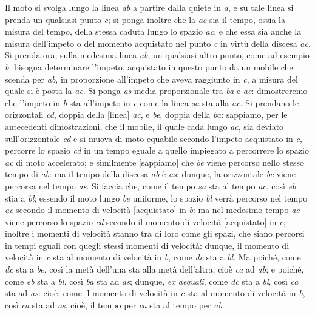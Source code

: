 \documentclass[11pt,twoside,openany]{book}
\begin{document}
Il moto si svolga lungo la linea \emph{ab} a partire dalla quiete in \emph{a}, e su tale linea si prenda un qualsiasi punto \emph{c}; si ponga inoltre che la \emph{ac} sia il tempo, ossia la misura del tempo, della stessa caduta lungo lo spazio \emph{ac}, e che essa sia anche la misura dell'impeto o del momento acquistato nel punto \emph{c} in virtù della discesa \emph{ac}. Si prenda ora, sulla medesima linea \emph{ab}, un qualsiasi altro punto, come ad esempio \emph{b}: bisogna determinare l'impeto, acquistato in questo punto da un mobile che scenda per \emph{ab}, in proporzione all'impeto che aveva raggiunto in \emph{c}, a misura del quale si è posta la \emph{ac}. Si ponga \emph{as} media proporzionale tra \emph{ba} e \emph{ac}: dimostreremo che l'impeto in \emph{b} sta all'impeto in \emph{c} come la linea \emph{sa} sta alla \emph{ac}. Si prendano le orizzontali \emph{cd}, doppia della [linea] \emph{ac}, e \emph{be}, doppia della \emph{ba}: sappiamo, per le antecedenti dimostrazioni, che il mobile, il quale cada lungo \emph{ac}, sia deviato sull'orizzontale \emph{cd} e si muova di moto equabile secondo l'impeto acquistato in \emph{c}, percorre lo spazio \emph{cd} in un tempo eguale a quello impiegato a percorrere lo spazio \emph{ac} di moto accelerato; e similmente [sappiamo] che \emph{be} viene percorso nello stesso tempo di \emph{ab}: ma il tempo della discesa \emph{ab} è \emph{as}: dunque, la orizzontale \emph{be} viene percorsa nel tempo \emph{as}. Si faccia che, come il tempo \emph{sa} sta al tempo \emph{ac}, così \emph{eb} stia a \emph{bl}; essendo il moto lungo \emph{be} uniforme, lo spazio \emph{bl} verrà percorso nel tempo \emph{ac} secondo il momento di velocità [acquistato] in \emph{b}: ma nel medesimo tempo \emph{ac} viene percorso lo spazio \emph{cd} secondo il momento di velocità [acquistato] in \emph{c}; inoltre i momenti di velocità stanno tra di loro come gli spazi, che siano percorsi in tempi eguali con quegli stessi momenti di velocità: dunque, il momento di velocità in \emph{c} sta al momento di velocità in \emph{b}, come \emph{dc} sta a \emph{bl}. Ma poiché, come \emph{dc} sta a \emph{be}, così la metà dell'una sta alla metà dell'altra, cioè \emph{ca} ad \emph{ab}; e poiché, come \emph{eb} sta a \emph{bl}, così \emph{ba} sta ad \emph{as}; dunque, \emph{ex aequali}, come \emph{dc} sta a \emph{bl}, così \emph{ca} sta ad \emph{as}: cioè, come il momento di velocità in \emph{c} sta al momento di velocità in \emph{b}, così \emph{ca} sta ad \emph{as}, cioè, il tempo per \emph{ca} sta al tempo per \emph{ab}.
\end{document}
